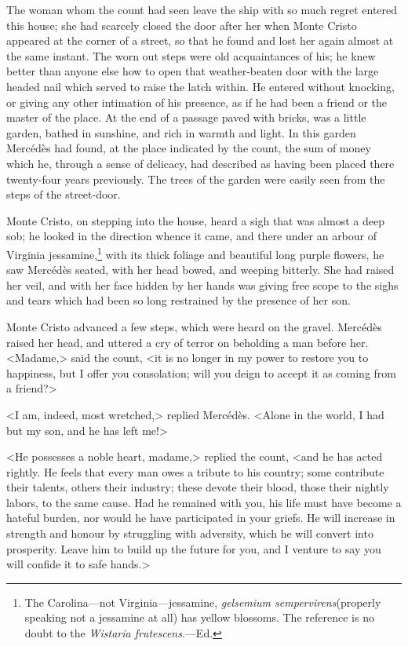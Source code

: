  The woman whom the count had seen leave the ship with so much regret entered this house; she had scarcely closed the door after her when Monte Cristo appeared at the corner of a street, so that he found and lost her again almost at the same instant. The worn out steps were old acquaintances of his; he knew better than anyone else how to open that weather-beaten door with the large headed nail which served to raise the latch within. He entered without knocking, or giving any other intimation of his presence, as if he had been a friend or the master of the place. At the end of a passage paved with bricks, was a little garden, bathed in sunshine, and rich in warmth and light. In this garden Mercédès had found, at the place indicated by the count, the sum of money which he, through a sense of delicacy, had described as having been placed there twenty-four years previously. The trees of the garden were easily seen from the steps of the street-door. 

 Monte Cristo, on stepping into the house, heard a sigh that was almost a deep sob; he looked in the direction whence it came, and there under an arbour of Virginia jessamine,\footnote{The Carolina—not Virginia—jessamine, \textit{gelsemium sempervirens}(properly speaking not a jessamine at all) has yellow blossoms. The reference is no doubt to the \textit{Wistaria frutescens}.—Ed.} with its thick foliage and beautiful long purple flowers, he saw Mercédès seated, with her head bowed, and weeping bitterly. She had raised her veil, and with her face hidden by her hands was giving free scope to the sighs and tears which had been so long restrained by the presence of her son. 

 Monte Cristo advanced a few steps, which were heard on the gravel. Mercédès raised her head, and uttered a cry of terror on beholding a man before her.  <Madame,> said the count, <it is no longer in my power to restore you to happiness, but I offer you consolation; will you deign to accept it as coming from a friend?> 

 <I am, indeed, most wretched,> replied Mercédès. <Alone in the world, I had but my son, and he has left me!> 

 <He possesses a noble heart, madame,> replied the count, <and he has acted rightly. He feels that every man owes a tribute to his country; some contribute their talents, others their industry; these devote their blood, those their nightly labors, to the same cause. Had he remained with you, his life must have become a hateful burden, nor would he have participated in your griefs. He will increase in strength and honour by struggling with adversity, which he will convert into prosperity. Leave him to build up the future for you, and I venture to say you will confide it to safe hands.> 

